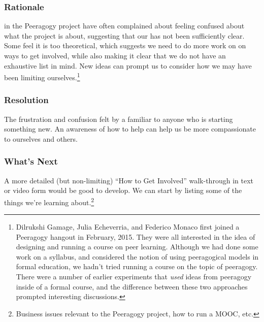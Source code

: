 \subsubsection*{Rationale}  in the Peeragogy project have often complained
about feeling confused about what the project is about, suggesting that our 
has not been sufficiently clear.  Some feel it is too theoretical, which suggests
we need to do more work on  on ways to get involved, while also
making it clear that we do not have an exhaustive list in mind.  New ideas can prompt us to consider how we may have been limiting ourselves.\footnote{Dilrukshi Gamage, Julia Echeverria, and Federico Monaco first joined a Peeragogy hangout in February, 2015.  They were all interested in the idea of designing and running a course on peer learning.  Although we had done some work on a syllabus, and considered the notion of using peeragogical models in formal education, we hadn't tried running a course on the topic of peeragogy.  There were a number of earlier experiments that \emph{used} ideas from peeragogy inside of a formal course, and the difference between these two approaches prompted interesting discussions.}

\subsubsection*{Resolution}
The frustration and confusion felt by a  familiar to anyone who is starting something new.  An awareness of how to help  can help us be more compassionate to ourselves and others.

\subsubsection*{What's Next} A more detailed (but non-limiting) ``How to Get Involved'' walk-through in text or video form would be good to develop. We can start by listing some of the things we're learning about.\footnote{Business issues relevant to the Peeragogy project, how to run a MOOC, etc.}
